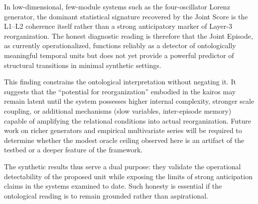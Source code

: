 In low-dimensional, few-module systems such as the four-oscillator Lorenz generator, the dominant statistical signature recovered by the Joint Score is the L1--L2 coherence itself rather than a strong anticipatory marker of Layer-3 reorganization. The honest diagnostic reading is therefore that the Joint Episode, as currently operationalized, functions reliably as a detector of ontologically meaningful temporal units but does not yet provide a powerful predictor of structural transitions in minimal synthetic settings.

This finding constrains the ontological interpretation without negating it. It suggests that the ``potential for reorganization'' embodied in the kairos may remain latent until the system possesses higher internal complexity, stronger scale coupling, or additional mechanisms (slow variables, inter-episode memory) capable of amplifying the relational conditions into actual reorganization. Future work on richer generators and empirical multivariate series will be required to determine whether the modest oracle ceiling observed here is an artifact of the testbed or a deeper feature of the framework.

The synthetic results thus serve a dual purpose: they validate the operational detectability of the proposed unit while exposing the limits of strong anticipation claims in the systems examined to date. Such honesty is essential if the ontological reading is to remain grounded rather than aspirational.